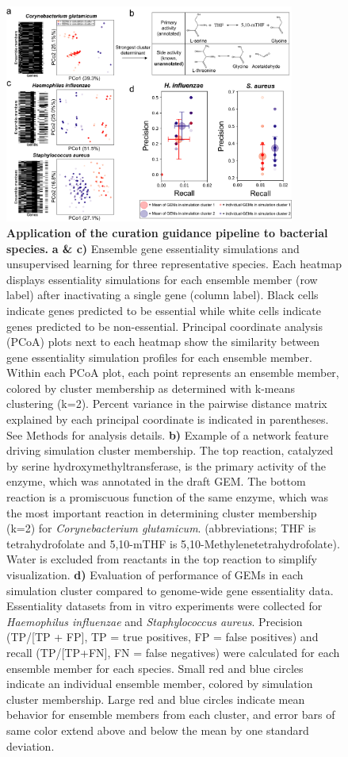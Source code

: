 \documentclass[11pt,twocolumn,notitlepage,openany,twoside]{book}
\begin{document}
\begin{refsection}
\begin{figure}
\centering
\includegraphics[width=0.85\textwidth]{ch3_fig3}
\caption[ Application of the curation guidance pipeline to bacterial species.]{\textbf{ Application of the curation guidance pipeline to bacterial species.}  \textbf{a \& c)} Ensemble gene essentiality simulations and unsupervised learning for three representative species. Each heatmap displays essentiality simulations for each ensemble member (row label) after inactivating a single gene (column label). Black cells indicate genes predicted to be essential while white cells indicate genes predicted to be non-essential. Principal coordinate analysis (PCoA) plots next to each heatmap show the similarity between gene essentiality simulation profiles for each ensemble member. Within each PCoA plot, each point represents an ensemble member, colored by cluster membership as determined with k-means clustering (k=2). Percent variance in the pairwise distance matrix explained by each principal coordinate is indicated in parentheses. See Methods for analysis details. \textbf{b)} Example of a network feature driving simulation cluster membership. The top reaction, catalyzed by serine hydroxymethyltransferase, is the primary activity of the enzyme, which was annotated in the draft GEM. The bottom reaction is a promiscuous function of the same enzyme, which was the most important reaction in determining cluster membership (k=2) for \textit{Corynebacterium glutamicum}. (abbreviations; THF is tetrahydrofolate and 5,10-mTHF is 5,10-Methylenetetrahydrofolate). Water is excluded from reactants in the top reaction to simplify visualization. \textbf{d)} Evaluation of performance of GEMs in each simulation cluster compared to genome-wide gene essentiality data. Essentiality datasets from in vitro experiments were collected for \textit{Haemophilus influenzae} and \textit{Staphylococcus aureus}. Precision (TP/[TP + FP], TP = true positives, FP = false positives) and recall (TP/[TP+FN], FN = false negatives) were calculated for each ensemble member for each species. Small red and blue circles indicate an individual ensemble member, colored by simulation cluster membership. Large red and blue circles indicate mean behavior for ensemble members from each cluster, and error bars of same color extend above and below the mean by one standard deviation.}
\end{figure}


\end{refsection}
\end{document}
